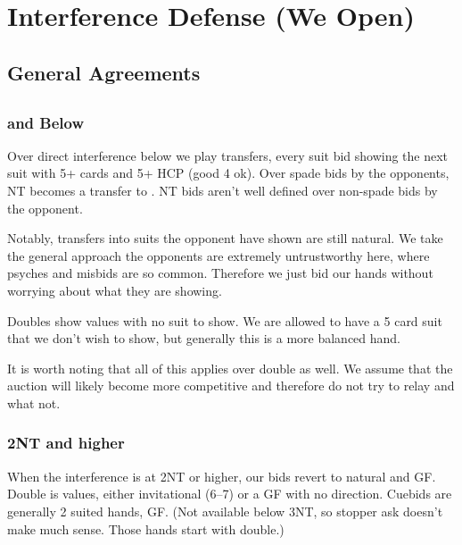 \documentclass[main]{subfile}
\begin{document}
	
\chapter{Interference Defense (We Open)}

	\section{General Agreements}
		
	\section[1C]{}
	
		\subsection[2S and Below]{ and Below}
		
		Over direct interference below  we play transfers, every suit bid showing the next suit with 5+ cards and 5+ HCP (good 4 ok). Over spade bids by the opponents, NT becomes a transfer to \ccc. NT bids aren't well defined over non-spade bids by the opponent. 
		
		Notably, transfers into suits the opponent have shown are still natural. We take the general approach the opponents are extremely untrustworthy here, where psyches and misbids are so common. Therefore we just bid our hands without worrying about what they are showing.
		
		Doubles show values with no suit to show. We are allowed to have a 5 card suit that we don't wish to show, but generally this is a more balanced hand.
	
		It is worth noting that all of this applies over double as well. We assume that the auction will likely become more competitive and therefore do not try to relay and what not. 
		
		\subsection{2NT and higher}
		
		When the interference is at 2NT or higher, our bids revert to natural and GF. Double is values, either invitational (6--7) or a GF with no direction. Cuebids are generally 2 suited hands, GF. (Not available below 3NT, so stopper ask doesn't make much sense. Those hands start with double.)
	
	\section[1D]{}
	
\end{document}
